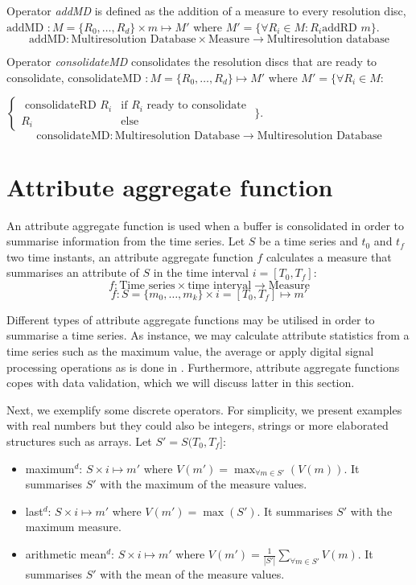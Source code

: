 Operator \emph{addMD} is defined as the addition of a measure to every
resolution disc, $\text{addMD } : M=\{R_0,\dotsc,R_d\} \times m
\mapsto M' $ where $M'= \{ \forall R_i\in M: R_i \text{
  addRD } m \}$.
\[
\text{addMD}: \text{Multiresolution Database} \times \text{Measure}
\longrightarrow \text{Multiresolution database}
\]


Operator \emph{consolidateMD} consolidates the resolution discs that
are ready to consolidate, $\text{consolidateMD } :
M=\{R_0,\dotsc,R_d\} \mapsto M'$ where $ M'= \big\{ \forall R_i\in M:$

  $\begin{cases}
    \text{ consolidateRD } R_i & \text{if } R_i \text{ ready to consolidate} \\
    R_i & \text{else }
  \end{cases}$ $\big\}
  $.
\[
\text{consolidateMD}: \text{Multiresolution Database} \longrightarrow
\text{Multiresolution Database}
  \]








\section{Attribute aggregate function}
\label{sec:model:interpolador}


An attribute aggregate function is used when a buffer is
consolidated in order to summarise information from the time series.
Let $S$ be a time series and $t_0$ and $t_f$ two time instants, an
attribute aggregate function $f$ calculates a measure that
summarises an attribute of $S$ in the time interval $i=[T_0,T_f]$:
\[
f: \text{Time series} \times \text{time interval} \longrightarrow
\text{Measure}
\]
\[
f: S=\{m_0,\ldots,m_k\} \times i=[T_0,T_f] \mapsto m'
\]

Different types of attribute aggregate functions may be utilised in
order to summarise a time series. As instance, we may calculate
attribute statistics from a time series such as the maximum value, the
average or apply digital signal processing operations as is done in
\cite{zhang11}.  Furthermore, attribute aggregate functions copes with
data validation, which we will discuss latter in this section.

Next, we exemplify some discrete operators. For simplicity, we present
examples with real numbers but they could also be integers, strings or
more elaborated structures such as arrays. Let $S'=S(T_0,T_f]$:
\begin{itemize}
\item maximum$^d$: $S \times i \mapsto m'$ where $V(m') = \max_{\forall m
    \in S'}(V(m))$. It summarises $S'$ with the maximum of
  the measure values.
\item last$^d$: $S \times i \mapsto m'$ where $V(m') = \max(S')$. It
  summarises $S'$ with the maximum measure.
\item arithmetic mean$^d$: $S \times i \mapsto m'$ where $V(m') =
  \frac{1}{|S'|} \sum\limits_{\forall m\in S'} V(m)$. It
  summarises $S'$ with the mean of the measure values.
\end{itemize}



